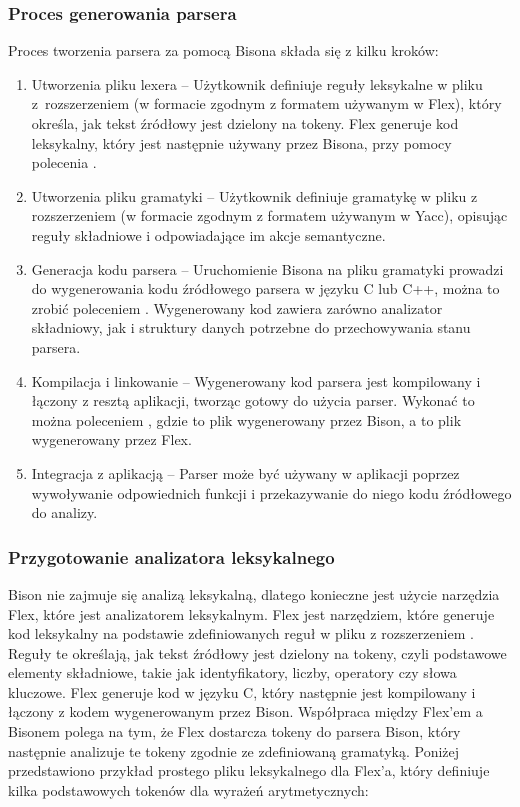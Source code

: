 \documentclass[12pt,twoside]{article}
\begin{document}
\subsubsection{Proces generowania parsera}
Proces tworzenia parsera za pomocą Bisona składa się z kilku kroków:
\begin{enumerate}[label=\arabic*), leftmargin=1.25cm]
      \item Utworzenia pliku lexera -- Użytkownik definiuje reguły leksykalne w pliku z~rozszerzeniem  (w formacie zgodnym z formatem używanym w Flex), który określa, jak tekst źródłowy jest dzielony na tokeny. Flex generuje kod leksykalny, który jest następnie używany przez Bisona, przy pomocy polecenia .
    \item Utworzenia pliku gramatyki -- Użytkownik definiuje gramatykę w pliku z rozszerzeniem  (w formacie zgodnym z formatem używanym w Yacc), opisując reguły składniowe i odpowiadające im akcje semantyczne. 
    \item Generacja kodu parsera -- Uruchomienie Bisona na pliku gramatyki prowadzi do wygenerowania kodu źródłowego parsera w języku C lub C++, można to zrobić poleceniem . Wygenerowany kod zawiera zarówno analizator składniowy, jak i struktury danych potrzebne do przechowywania stanu parsera.
    \item Kompilacja i linkowanie -- Wygenerowany kod parsera jest kompilowany i łączony z resztą aplikacji, tworząc gotowy do użycia parser. Wykonać to można poleceniem , gdzie  to plik wygenerowany przez Bison, a  to plik wygenerowany przez Flex.
    \item Integracja z aplikacją -- Parser może być używany w aplikacji poprzez wywoływanie odpowiednich funkcji i przekazywanie do niego kodu źródłowego do analizy.
\end{enumerate}

\subsubsection{Przygotowanie analizatora leksykalnego}
Bison nie zajmuje się analizą leksykalną, dlatego konieczne jest użycie narzędzia Flex, które jest analizatorem leksykalnym. Flex jest narzędziem, które generuje kod leksykalny na podstawie zdefiniowanych reguł w pliku z rozszerzeniem . Reguły te określają, jak tekst źródłowy jest dzielony na tokeny, czyli podstawowe elementy składniowe, takie jak identyfikatory, liczby, operatory czy słowa kluczowe. Flex generuje kod w języku C, który następnie jest kompilowany i łączony z kodem wygenerowanym przez Bison. Współpraca między Flex'em a Bisonem polega na tym, że Flex dostarcza tokeny do parsera Bison, który następnie analizuje te tokeny zgodnie ze zdefiniowaną gramatyką. Poniżej przedstawiono przykład prostego pliku leksykalnego dla Flex'a, który definiuje kilka podstawowych tokenów dla wyrażeń arytmetycznych:
\end{document}

